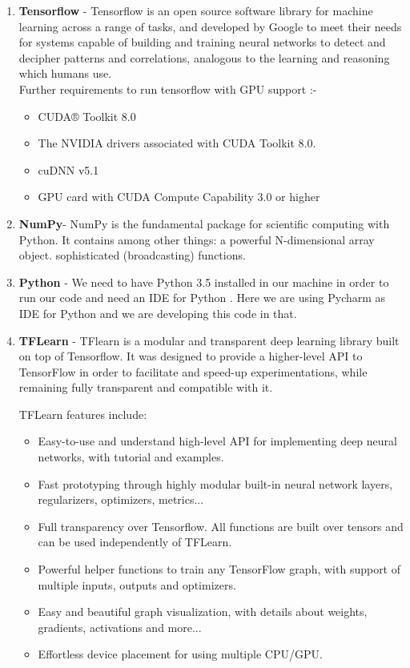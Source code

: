 \begin{enumerate}
	\item \textbf{Tensorflow} - Tensorflow is an open source software library for machine learning across a range of tasks, and developed by Google to meet their needs for systems capable of building and training neural networks to detect and decipher patterns and correlations, analogous to the learning and reasoning which humans use.\\
	
	Further requirements to run tensorflow with GPU support :-
	\begin{itemize}
		\item CUDA® Toolkit 8.0
		\item The NVIDIA drivers associated with CUDA Toolkit 8.0.
		\item cuDNN v5.1
		\item GPU card with CUDA Compute Capability 3.0 or higher
	\end{itemize}
	
	\item \textbf{NumPy}- NumPy is the fundamental package for scientific computing with Python. It contains among other things: a powerful N-dimensional array object. sophisticated (broadcasting) functions.
	
	\item \textbf{Python} - We need to have Python 3.5 installed in our machine in order to run our code and need an IDE for Python . Here we are using Pycharm as IDE for Python and we are developing this code in that.
	
	\item \textbf{TFLearn} - TFlearn is a modular and transparent deep learning library built on top of Tensorflow. It was designed to provide a higher-level API to TensorFlow in order to facilitate and speed-up experimentations, while remaining fully transparent and compatible with it.
	
	TFLearn features include:
	\begin{itemize}
		\item Easy-to-use and understand high-level API for implementing deep neural networks, with tutorial and examples.
		\item Fast prototyping through highly modular built-in neural network layers, regularizers, optimizers, metrics...
		\item Full transparency over Tensorflow. All functions are built over tensors and can be used independently of TFLearn.
		\item Powerful helper functions to train any TensorFlow graph, with support of multiple inputs, outputs and optimizers.
		\item Easy and beautiful graph visualization, with details about weights, gradients, activations and more...
		\item Effortless device placement for using multiple CPU/GPU.
		

\end{itemize}
\end{enumerate}
